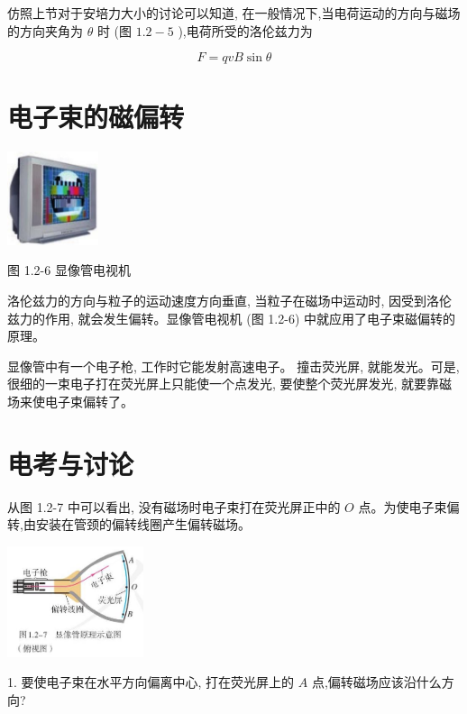 \documentclass[10pt]{article}
\begin{document}
仿照上节对于安培力大小的讨论可以知道, 在一般情况下,当电荷运动的方向与磁场的方向夹角为 \(\theta\) 时 (图 \({1.2} - 5\) ),电荷所受的洛伦兹力为

\[
F = {qvB}\sin \theta
\]

\section*{电子束的磁偏转}

\begin{center}
\includegraphics[max width=0.2\textwidth]{images/01910e72-c5b7-7ed5-a6d4-fb3a5faefc32_15_486460.jpg}
\end{center}

图 1.2-6 显像管电视机

洛伦兹力的方向与粒子的运动速度方向垂直, 当粒子在磁场中运动时, 因受到洛伦兹力的作用, 就会发生偏转。显像管电视机 (图 1.2-6) 中就应用了电子束磁偏转的原理。

显像管中有一个电子枪, 工作时它能发射高速电子。 撞击荧光屏, 就能发光。可是, 很细的一束电子打在荧光屏上只能使一个点发光, 要使整个荧光屏发光, 就要靠磁场来使电子束偏转了。

\section*{电考与讨论}

从图 1.2-7 中可以看出, 没有磁场时电子束打在荧光屏正中的 \(O\) 点。为使电子束偏转,由安装在管颈的偏转线圈产生偏转磁场。

\begin{center}
\includegraphics[max width=0.3\textwidth]{images/01910e72-c5b7-7ed5-a6d4-fb3a5faefc32_15_886718.jpg}
\end{center}

1. 要使电子束在水平方向偏离中心, 打在荧光屏上的 \(A\) 点,偏转磁场应该沿什么方向?
\end{document}
